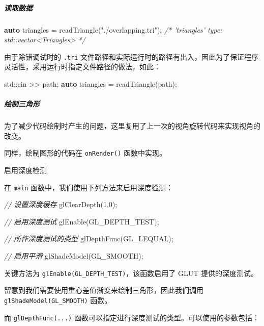 \documentclass[
]{article}
\newenvironment{Shaded}{}{}
\newcommand{\BuiltInTok}[1]{#1}
\newcommand{\CommentTok}[1]{\textcolor[rgb]{0.38,0.63,0.69}{\textit{#1}}}
\newcommand{\FloatTok}[1]{\textcolor[rgb]{0.25,0.63,0.44}{#1}}
\newcommand{\KeywordTok}[1]{\textcolor[rgb]{0.00,0.44,0.13}{\textbf{#1}}}
\newcommand{\NormalTok}[1]{#1}
\newcommand{\StringTok}[1]{\textcolor[rgb]{0.25,0.44,0.63}{#1}}
\begin{document}
\hypertarget{header-n36}{%
\subparagraph{读取数据}\label{header-n36}}

\begin{Shaded}
\begin{Highlighting}[]
\KeywordTok{auto}\NormalTok{ triangles = readTriangle(}\StringTok{"./overlapping.tri"}\NormalTok{);}
\CommentTok{/* 'triangles' type: std::vector<Triangles> */}
\end{Highlighting}
\end{Shaded}

由于除错调试时的 \texttt{.tri}
文件路径和实际运行时的路径有出入，因此为了保证程序灵活性，采用运行时指定文件路径的做法，如此：

\begin{Shaded}
\begin{Highlighting}[]
\BuiltInTok{std::}\NormalTok{cin >> path;}
\KeywordTok{auto}\NormalTok{ triangles = readTriangle(path);}
\end{Highlighting}
\end{Shaded}

\hypertarget{header-n46}{%
\subparagraph{绘制三角形}\label{header-n46}}

为了减少代码绘制时产生的问题，这里复用了上一次的视角旋转代码来实现视角的改变。

同样，绘制图形的代码在 \texttt{onRender()} 函数中实现。

启用深度检测

在 \texttt{main} 函数中，我们使用下列方法来启用深度检测：

\begin{Shaded}
\begin{Highlighting}[]
\CommentTok{// 设置深度缓存}
\NormalTok{glClearDepth(}\FloatTok{1.0}\NormalTok{);}

\CommentTok{// 启用深度测试}
\NormalTok{glEnable(GL_DEPTH_TEST);}

\CommentTok{// 所作深度测试的类型}
\NormalTok{glDepthFunc(GL_LEQUAL);}

\CommentTok{// 启用平滑}
\NormalTok{glShadeModel(GL_SMOOTH);}
\end{Highlighting}
\end{Shaded}

关键方法为 \texttt{glEnable(GL\_DEPTH\_TEST)}，该函数启用了 GLUT
提供的深度测试。

留意到我们需要使用重心差值渐变来绘制三角形，因此我们调用
\texttt{glShadeModel(GL\_SMOOTH)} 函数。

而 \texttt{glDepthFunc(...)}
函数可以指定进行深度测试的类型。可以使用的参数包括：
\end{document}
